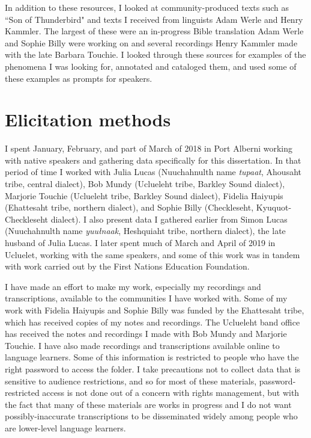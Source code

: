 In addition to these resources, I looked at community-produced texts such as ``Son of Thunderbird" and texts I received from linguists Adam Werle and Henry Kammler. The largest of these were an in-progress Bible translation Adam Werle and Sophie Billy were working on and several recordings Henry Kammler made with the late Barbara Touchie. I looked through these sources for examples of the phenomena I was looking for, annotated and cataloged them, and used some of these examples as prompts for speakers.

\section{Elicitation methods} \label{ch:method:elicitation}

I spent January, February, and part of March of 2018 in Port Alberni working with native speakers and gathering data specifically for this dissertation. In that period of time I worked with Julia Lucas (Nuuchahnulth name \textit{tupaat}, Ahousaht tribe, central dialect), Bob Mundy (Uclueleht tribe, Barkley Sound dialect), Marjorie Touchie (Uclueleht tribe, Barkley Sound dialect), Fidelia Haiyupis (Ehattesaht tribe, northern dialect), and Sophie Billy (Checkleseht, Kyuquot-Checkleseht dialect). I also present data I gathered earlier from Simon Lucas (Nuuchahnulth name \textit{yuułnaak}, Heshquiaht tribe, northern dialect), the late husband of Julia Lucas. I later spent much of March and April of 2019 in Ucluelet, working with the same speakers, and some of this work was in tandem with work carried out by the First Nations Education Foundation.

I have made an effort to make my work, especially my recordings and transcriptions, available to the communities I have worked with. Some of my work with Fidelia Haiyupis and Sophie Billy was funded by the Ehattesaht tribe, which has received copies of my notes and recordings. The Uclueleht band office has received the notes and recordings I made with Bob Mundy and Marjorie Touchie. I have also made recordings and transcriptions available online to language learners. Some of this information is restricted to people who have the right password to access the folder. I take precautions not to collect data that is sensitive to audience restrictions, and so for most of these materials, password-restricted access is not done out of a concern with rights management, but with the fact that many of these materials are works in progress and I do not want possibly-inaccurate transcriptions to be disseminated widely among people who are lower-level language learners.

